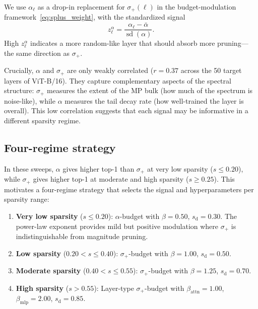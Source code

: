\documentclass[11pt]{article}
\theoremstyle{plain}
\theoremstyle{definition}
\theoremstyle{remark}
\newcommand{\1}{\mathbf{1}}
\begin{document}
We use \(\alpha_\ell\) as a drop-in replacement for \(\sigma_+(\ell)\) in the budget-modulation framework~\eqref{eq:splus_weight}, with the standardized signal
\[
z_\ell^\alpha = \frac{\alpha_\ell - \bar{\alpha}}{\operatorname{sd}(\alpha)}.
\]
High \(z_\ell^\alpha\) indicates a more random-like layer that should absorb more pruning---the same direction as \(\sigma_+\).

Crucially, \(\alpha\) and \(\sigma_+\) are only weakly correlated (\(r=0.37\) across the 50 target layers of ViT-B/16).  They capture complementary aspects of the spectral structure: \(\sigma_+\) measures the extent of the MP bulk (how much of the spectrum is noise-like), while \(\alpha\) measures the tail decay rate (how well-trained the layer is overall).  This low correlation suggests that each signal may be informative in a different sparsity regime.

\subsection{Four-regime strategy}
\label{subsec:four_regime}

In these sweeps, \(\alpha\) gives higher top-1 than \(\sigma_+\) at very low sparsity (\(s \le 0.20\)), while \(\sigma_+\) gives higher top-1 at moderate and high sparsity (\(s \ge 0.25\)).  This motivates a four-regime strategy that selects the signal and hyperparameters per sparsity range:

\begin{enumerate}[leftmargin=2em]
\item \textbf{Very low sparsity} (\(s \le 0.20\)):  \(\alpha\)-budget with \(\beta=0.50\), \(s_{\mathrm{d}}=0.30\).  The power-law exponent provides mild but positive modulation where \(\sigma_+\) is indistinguishable from magnitude pruning.

\item \textbf{Low sparsity} (\(0.20 < s \le 0.40\)):  \(\sigma_+\)-budget with \(\beta=1.00\), \(s_{\mathrm{d}}=0.50\).

\item \textbf{Moderate sparsity} (\(0.40 < s \le 0.55\)):  \(\sigma_+\)-budget with \(\beta=1.25\), \(s_{\mathrm{d}}=0.70\).

\item \textbf{High sparsity} (\(s > 0.55\)):  Layer-type \(\sigma_+\)-budget with \(\beta_{\mathrm{attn}}=1.00\), \(\beta_{\mathrm{mlp}}=2.00\), \(s_{\mathrm{d}}=0.85\).
\end{enumerate}
\end{document}

